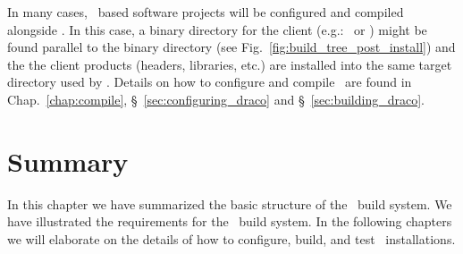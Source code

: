 In many cases, \draco\ based software projects will be configured and compiled alongside \draco.  In this case, a binary directory for the client (e.g.: \clubimc\ or \capsaicin) might be found parallel to the  binary directory (see Fig.~\ref{fig:build_tree_post_install}) and the the client products (headers, libraries, etc.) are installed into the same target directory used by \draco.  Details on how to configure and compile \draco\ are found in Chap.~\ref{chap:compile}, \S~\ref{sec:configuring_draco} and \S~\ref{sec:building_draco}.


\section{Summary}

In this chapter we have summarized the basic structure of the \draco\ 
build system.  We have illustrated the requirements for the \draco\ 
build system.  In the following chapters we will elaborate on the
details of how to configure, build, and test \draco\ installations.

